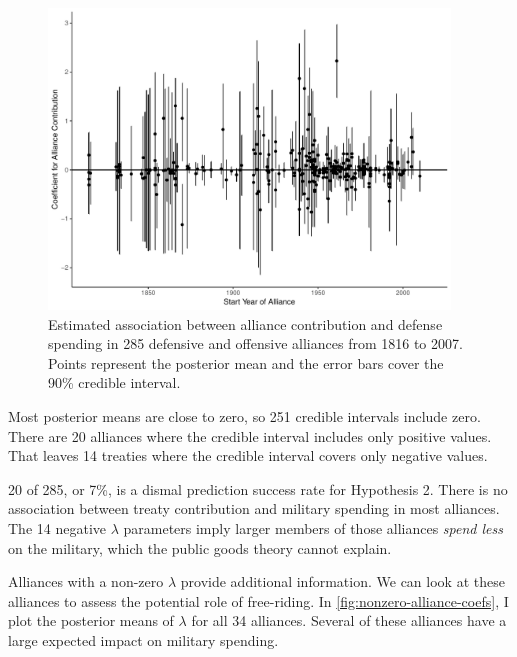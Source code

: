 \documentclass[12pt]{article}
\begin{document}
\begin{figure}[htbp]
	\centering
		\includegraphics[width=0.95\textwidth]{alliance-coefs-year.pdf}
	\caption{Estimated association between alliance contribution and defense spending in 285 defensive and offensive alliances from 1816 to 2007. Points represent the posterior mean and the error bars cover the 90\% credible interval.}
	\label{fig:alliance-coefs-year}
\end{figure}


Most posterior means are close to zero, so 251 credible intervals include zero. 
There are 20 alliances where the credible interval includes only positive values. 
That leaves 14 treaties where the credible interval covers only negative values. 


20 of 285, or 7\%, is a dismal prediction success rate for Hypothesis 2. 
There is no association between treaty contribution and military spending in most alliances.
The 14 negative $\lambda$ parameters imply larger members of those alliances \emph{spend less} on the military, which the public goods theory cannot explain. 


Alliances with a non-zero $\lambda$ provide additional information. 
We can look at these alliances to assess the potential role of free-riding. 
In \autoref{fig:nonzero-alliance-coefs}, I plot the posterior means of $\lambda$ for all 34 alliances.  
Several of these alliances have a large expected impact on military spending. 
\end{document}
